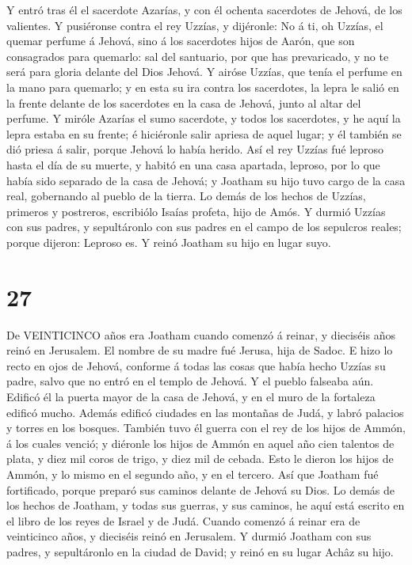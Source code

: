  Y entró tras él el sacerdote Azarías, y con él ochenta
sacerdotes de Jehová, de los valientes.  Y pusiéronse
contra el rey Uzzías, y dijéronle: No á ti, oh Uzzías, el quemar perfume
á Jehová, sino á los sacerdotes hijos de Aarón, que son consagrados para
quemarlo: sal del santuario, por que has prevaricado, y no te será para
gloria delante del Dios Jehová.  Y airóse Uzzías, que tenía
el perfume en la mano para quemarlo; y en esta su ira contra los
sacerdotes, la lepra le salió en la frente delante de los sacerdotes en
la casa de Jehová, junto al altar del perfume.  Y miróle
Azarías el sumo sacerdote, y todos los sacerdotes, y he aquí la lepra
estaba en su frente; é hiciéronle salir apriesa de aquel lugar; y él
también se dió priesa á salir, porque Jehová lo había herido.
 Así el rey Uzzías fué leproso hasta el día de su muerte, y
habitó en una casa apartada, leproso, por lo que había sido separado de
la casa de Jehová; y Joatham su hijo tuvo cargo de la casa real,
gobernando al pueblo de la tierra.  Lo demás de los hechos
de Uzzías, primeros y postreros, escribiólo Isaías profeta, hijo de
Amós.  Y durmió Uzzías con sus padres, y sepultáronlo con
sus padres en el campo de los sepulcros reales; porque dijeron: Leproso
es. Y reinó Joatham su hijo en lugar suyo.

\hypertarget{section-26}{%
\section{27}\label{section-26}}

 De VEINTICINCO años era Joatham cuando comenzó á reinar, y
dieciséis años reinó en Jerusalem. El nombre de su madre fué Jerusa,
hija de Sadoc.  E hizo lo recto en ojos de Jehová, conforme
á todas las cosas que había hecho Uzzías su padre, salvo que no entró en
el templo de Jehová. Y el pueblo falseaba aún.  Edificó él
la puerta mayor de la casa de Jehová, y en el muro de la fortaleza
edificó mucho.  Además edificó ciudades en las montañas de
Judá, y labró palacios y torres en los bosques.  También
tuvo él guerra con el rey de los hijos de Ammón, á los cuales venció; y
diéronle los hijos de Ammón en aquel año cien talentos de plata, y diez
mil coros de trigo, y diez mil de cebada. Esto le dieron los hijos de
Ammón, y lo mismo en el segundo año, y en el tercero.  Así
que Joatham fué fortificado, porque preparó sus caminos delante de
Jehová su Dios.  Lo demás de los hechos de Joatham, y todas
sus guerras, y sus caminos, he aquí está escrito en el libro de los
reyes de Israel y de Judá.  Cuando comenzó á reinar era de
veinticinco años, y dieciséis reinó en Jerusalem.  Y durmió
Joatham con sus padres, y sepultáronlo en la ciudad de David; y reinó en
su lugar Achâz su hijo.

